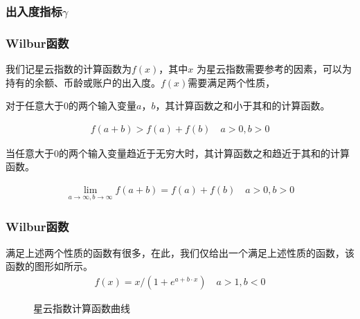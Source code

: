 \begin{frame}
\frametitle{出入度指标$\gamma$}

\end{frame}



\begin{frame}
\frametitle{Wilbur函数}

我们记星云指数的计算函数为\(f(x)\)，其中\(x\)
为星云指数需要参考的因素，可以为持有的余额、币龄或账户的出入度。$f(x)$需要满足两个性质，

\begin{property}
对于任意大于$0$的两个输入变量$a$，$b$，其计算函数之和小于其和的计算函数。
\end{property}

\begin{align}
f(a+b)>f(a)+f(b) \quad a>0,b>0
\end{align}

\begin{property}
当任意大于$0$的两个输入变量趋近于无穷大时，其计算函数之和趋近于其和的计算函数。
\end{property}

\begin{align}
\lim\limits_{a \to \infty, b\to \infty} f(a+b) = f(a) + f(b)\quad a>0, b>0
\end{align}

\end{frame}

\begin{frame}
\frametitle{Wilbur函数}
\noindent 满足上述两个性质的函数有很多，在此，我们仅给出一个满足上述性质的函数，该函数的图形如所示。
\begin{align}
f(x) = x/(1 + e^{a + b\cdot x}) \quad a>1,b<0
\end{align}

\begin{figure}
\centering
{}
\caption{星云指数计算函数曲线 \label{fig-nr}}
\end{figure}
\end{frame}

